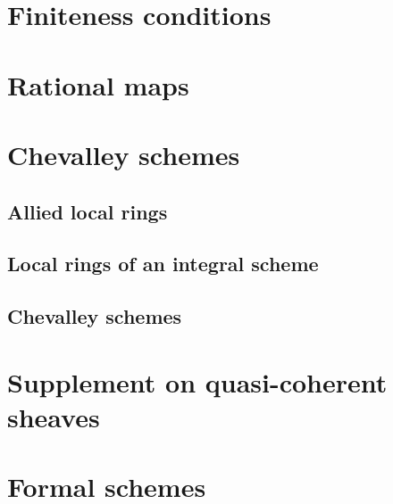 \documentclass[10pt,oneside]{amsart}
\begin{document}
    \section{Finiteness conditions}

    \section{Rational maps}

    \section{Chevalley schemes}

        \subsection{Allied local rings}
        

        \subsection{Local rings of an integral scheme}
        

        \subsection{Chevalley schemes}
        

    \section{Supplement on quasi-coherent sheaves}

    \section{Formal schemes}
\end{document}
